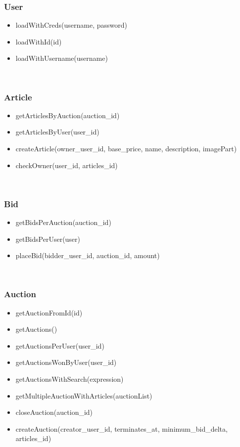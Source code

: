 \documentclass[12pt, a4paper, renqo, final]{amsart}
\begin{document}
			\subsubsection{User}
			\begin{itemize}
				\item loadWithCreds(username, password)
				\item loadWithId(id)
				\item loadWithUsername(username)
			\end{itemize}
			\phantom{.}\\
			\subsubsection{Article}
			\begin{itemize}
				\item getArticlesByAuction(auction\_id)
				\item getArticlesByUser(user\_id)
				\item createArticle(owner\_user\_id, base\_price, name, description, imagePart)
				\item checkOwner(user\_id, articles\_id)
			\end{itemize}
			\phantom{.}\\
			\subsubsection{Bid}
			\begin{itemize}
				\item getBidsPerAuction(auction\_id)
				\item getBidsPerUser(user)
				\item placeBid(bidder\_user\_id, auction\_id, amount)
			\end{itemize}
			\phantom{.}\\
			\subsubsection{Auction}
			\begin{itemize}
				\item getAuctionFromId(id)
				\item getAuctions()
				\item getAuctionsPerUser(user\_id)
				\item getAuctionsWonByUser(user\_id)
				\item getAuctionsWithSearch(expression)
				\item getMultipleAuctionWithArticles(auctionList)
				\item closeAuction(auction\_id)
				\item createAuction(creator\_user\_id, terminates\_at, minimum\_bid\_delta, articles\_id)
			\end{itemize}
\end{document}
